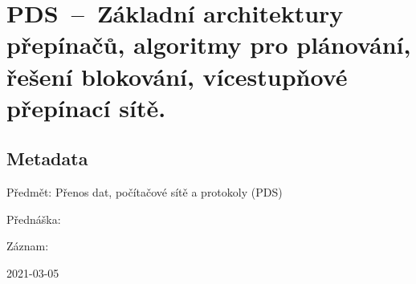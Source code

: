 

\graphicspath{{pds/prepinace/figures}}


\chapter{PDS~--~Základní architektury přepínačů, algoritmy pro plánování, řešení blokování, vícestupňové přepínací sítě.}



\section{Metadata}

\begin{compactitem}
    \item Předmět: Přenos dat, počítačové sítě a protokoly (PDS)
    \item Přednáška:
    \begin{compactitem}
        \item {}
    \end{compactitem}
    \item Záznam:
    \begin{compactitem}
        \item 2021-03-05
    \end{compactitem}
\end{compactitem}

